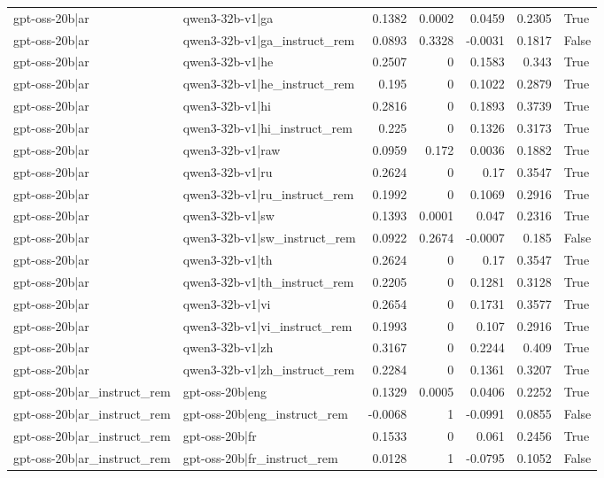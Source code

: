 \begin{table}
\begin{tabular}{l l r r r r l}
gpt-oss-20b|ar & qwen3-32b-v1|ga & 0.1382 & 0.0002 & 0.0459 & 0.2305 & True \\
gpt-oss-20b|ar & qwen3-32b-v1|ga_instruct_rem & 0.0893 & 0.3328 & -0.0031 & 0.1817 & False \\
gpt-oss-20b|ar & qwen3-32b-v1|he & 0.2507 & 0 & 0.1583 & 0.343 & True \\
gpt-oss-20b|ar & qwen3-32b-v1|he_instruct_rem & 0.195 & 0 & 0.1022 & 0.2879 & True \\
gpt-oss-20b|ar & qwen3-32b-v1|hi & 0.2816 & 0 & 0.1893 & 0.3739 & True \\
gpt-oss-20b|ar & qwen3-32b-v1|hi_instruct_rem & 0.225 & 0 & 0.1326 & 0.3173 & True \\
gpt-oss-20b|ar & qwen3-32b-v1|raw & 0.0959 & 0.172 & 0.0036 & 0.1882 & True \\
gpt-oss-20b|ar & qwen3-32b-v1|ru & 0.2624 & 0 & 0.17 & 0.3547 & True \\
gpt-oss-20b|ar & qwen3-32b-v1|ru_instruct_rem & 0.1992 & 0 & 0.1069 & 0.2916 & True \\
gpt-oss-20b|ar & qwen3-32b-v1|sw & 0.1393 & 0.0001 & 0.047 & 0.2316 & True \\
gpt-oss-20b|ar & qwen3-32b-v1|sw_instruct_rem & 0.0922 & 0.2674 & -0.0007 & 0.185 & False \\
gpt-oss-20b|ar & qwen3-32b-v1|th & 0.2624 & 0 & 0.17 & 0.3547 & True \\
gpt-oss-20b|ar & qwen3-32b-v1|th_instruct_rem & 0.2205 & 0 & 0.1281 & 0.3128 & True \\
gpt-oss-20b|ar & qwen3-32b-v1|vi & 0.2654 & 0 & 0.1731 & 0.3577 & True \\
gpt-oss-20b|ar & qwen3-32b-v1|vi_instruct_rem & 0.1993 & 0 & 0.107 & 0.2916 & True \\
gpt-oss-20b|ar & qwen3-32b-v1|zh & 0.3167 & 0 & 0.2244 & 0.409 & True \\
gpt-oss-20b|ar & qwen3-32b-v1|zh_instruct_rem & 0.2284 & 0 & 0.1361 & 0.3207 & True \\
gpt-oss-20b|ar_instruct_rem & gpt-oss-20b|eng & 0.1329 & 0.0005 & 0.0406 & 0.2252 & True \\
gpt-oss-20b|ar_instruct_rem & gpt-oss-20b|eng_instruct_rem & -0.0068 & 1 & -0.0991 & 0.0855 & False \\
gpt-oss-20b|ar_instruct_rem & gpt-oss-20b|fr & 0.1533 & 0 & 0.061 & 0.2456 & True \\
gpt-oss-20b|ar_instruct_rem & gpt-oss-20b|fr_instruct_rem & 0.0128 & 1 & -0.0795 & 0.1052 & False \\

\end{tabular}
\end{table}
